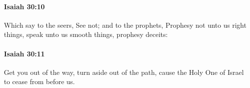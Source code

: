 		\paragraph{Isaiah 30:10} %
			\label{ISAIAH-30-10}

			Which say to the seers, See not; and to the prophets, Prophesy not unto us right things, speak unto us smooth things, prophesy deceits:


		\paragraph{Isaiah 30:11} %
			\label{ISAIAH-30-11}

			Get you out of the way, turn aside out of the path, cause the Holy One of Israel to cease from before us.


